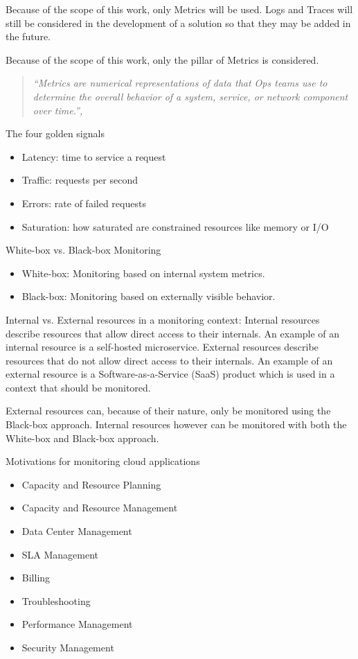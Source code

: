 Because of the scope of this work, only Metrics will be used. Logs and Traces will still be considered
in the development of a solution so that they may be added in the future.

Because of the scope of this work, only the pillar of Metrics is considered.

\begin{quote}
\textit{``Metrics are numerical representations of data that Ops teams use to determine the overall behavior of a system, service, or network component over time.'', \cite{9837035}}
\end{quote}

The four golden signals \cite{Beyer2016-xi}
\begin{itemize}
    \item Latency: time to service a request
    \item Traffic: requests per second
    \item Errors: rate of failed requests
    \item Saturation: how saturated are constrained resources like memory or I/O
\end{itemize}

White-box vs. Black-box Monitoring \cite{Beyer2016-xi}
\begin{itemize}
    \item White-box: Monitoring based on internal system metrics.
    \item Black-box: Monitoring based on externally visible behavior.
\end{itemize}

Internal vs. External resources in a monitoring context:
Internal resources describe resources that allow direct access to their internals.
An example of an internal resource is a self-hosted microservice.
External resources describe resources that do not allow direct access to their internals.
An example of an external resource is a Software-as-a-Service (SaaS) product which is used in a context that should be monitored.

External resources can, because of their nature, only be monitored using the Black-box approach.
Internal resources however can be monitored with both the White-box and Black-box approach.

Motivations for monitoring cloud applications \cite{6483656}
\begin{itemize}
    \item Capacity and Resource Planning
    \item Capacity and Resource Management
    \item Data Center Management
    \item SLA Management
    \item Billing
    \item Troubleshooting
    \item Performance Management
    \item Security Management
\end{itemize}

